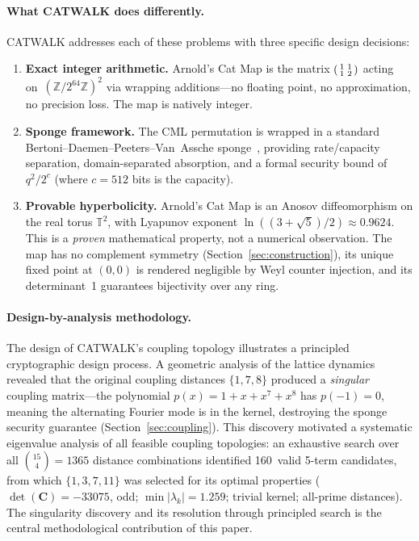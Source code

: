 \documentclass[runningheads]{llncs}
\newcommand{\Ztwo}{\mathbb{Z}/2^{64}\mathbb{Z}}
\newcommand{\coupmat}{\mathbf{C}}
\begin{document}
\paragraph{What CATWALK does differently.}
CATWALK addresses each of these problems with three specific design decisions:
\begin{enumerate}[nosep]
\item \textbf{Exact integer arithmetic.}
  Arnold's Cat Map is the matrix $\begin{psmallmatrix}1&1\\1&2\end{psmallmatrix}$
  acting on~$(\Ztwo)^2$ via wrapping additions---no floating point, no
  approximation, no precision loss.  The map is natively integer.
\item \textbf{Sponge framework.}
  The CML permutation is wrapped in a standard Bertoni--Daemen--Peeters--Van~Assche
  sponge~\cite{bertoni2007sponge,bertoni2008indifferentiability},
  providing rate/capacity separation, domain-separated absorption, and
  a formal security bound of $q^2/2^c$ (where $c = 512$ bits is the capacity).
\item \textbf{Provable hyperbolicity.}
  Arnold's Cat Map is an Anosov diffeomorphism on the real torus $\mathbb{T}^2$,
  with Lyapunov exponent $\ln((3+\sqrt{5})/2) \approx 0.9624$.
  This is a \emph{proven} mathematical property, not a numerical observation.
  The map has no complement symmetry (Section~\ref{sec:construction}),
  its unique fixed point at $(0,0)$ is rendered negligible by Weyl counter
  injection, and its determinant~1 guarantees bijectivity over any ring.
\end{enumerate}

\paragraph{Design-by-analysis methodology.}
The design of CATWALK's coupling topology illustrates a principled
cryptographic design process.
A geometric analysis of the lattice dynamics revealed that the original
coupling distances $\{1,7,8\}$ produced a \emph{singular} coupling matrix---the
polynomial $p(x) = 1+x+x^7+x^8$ has $p(-1) = 0$, meaning the alternating
Fourier mode is in the kernel, destroying the sponge security guarantee
(Section~\ref{sec:coupling}).
This discovery motivated a systematic eigenvalue analysis of all feasible
coupling topologies:  an exhaustive search over all $\binom{15}{4} = 1365$
distance combinations identified 160~valid 5-term candidates, from which
$\{1,3,7,11\}$ was selected for its optimal properties
($\det(\coupmat) = -33075$, odd; $\min|\lambda_k| = 1.259$; trivial kernel;
all-prime distances).
The singularity discovery and its resolution through principled search is
the central methodological contribution of this paper.
\end{document}
